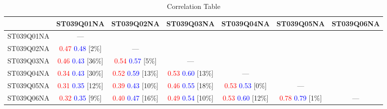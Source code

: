 \begin{landscape}
\begin{table} \flushleft
\begin{threeparttable}[htbp]
  \caption{Correlation Table}
  \label{tab:2}
    \begin{tabular}{ccccccc}
    \toprule
          & ST039Q01NA & ST039Q02NA & ST039Q03NA & ST039Q04NA & ST039Q05NA & ST039Q06NA \\
    \midrule
    ST039Q01NA & ---   &       &       &       &       &  \\
    ST039Q02NA & \textcolor{red}{0.47} \textcolor{blue}{0.48} [2\%]  & ---   &       &       &       &  \\
    ST039Q03NA & \textcolor{red}{0.46} \textcolor{blue}{0.43} [36\%]  & \textcolor{red}{0.54} \textcolor{blue}{0.57} [5\%]  & ---   &       &       &  \\
    ST039Q04NA & \textcolor{red}{0.34} \textcolor{blue}{0.43} [30\%]  & \textcolor{red}{0.52} \textcolor{blue}{0.59} [13\%]  & \textcolor{red}{0.53} \textcolor{blue}{0.60} [13\%]  & ---   &       &  \\
    ST039Q05NA & \textcolor{red}{0.31} \textcolor{blue}{0.35} [12\%]  & \textcolor{red}{0.39} \textcolor{blue}{0.43} [10\%]  & \textcolor{red}{0.46} \textcolor{blue}{0.55} [18\%]  & \textcolor{red}{0.53} \textcolor{blue}{0.53} [0\%]  & ---   &  \\
    ST039Q06NA & \textcolor{red}{0.32} \textcolor{blue}{0.35} [9\%]  & \textcolor{red}{0.40} \textcolor{blue}{0.47} [16\%]  & \textcolor{red}{0.49} \textcolor{blue}{0.54} [10\%]  & \textcolor{red}{0.53} \textcolor{blue}{0.60} [12\%]  & \textcolor{red}{0.78} \textcolor{blue}{0.79} [1\%]  & --- \\
    \bottomrule   
    \end{tabular}
\end{threeparttable}
\end{table}
\end{landscape}

